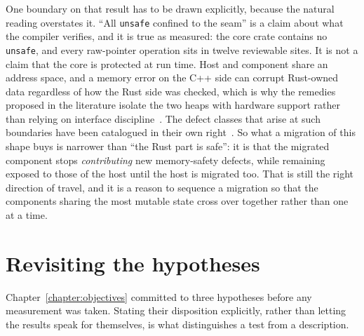 \documentclass[english,twoside,openright,a4paper,censored,csm,software-track-2020]{HYthesisML}
\begin{document}
One boundary on that result has to be drawn explicitly, because the natural reading overstates
it. ``All \texttt{unsafe} confined to the seam'' is a claim about what the compiler verifies,
and it is true as measured: the core crate contains no \texttt{unsafe}, and every raw-pointer
operation sits in twelve reviewable sites. It is not a claim that the core is protected at run
time. Host and component share an address space, and a memory error on the C++ side can corrupt
Rust-owned data regardless of how the Rust side was checked, which is why the remedies proposed
in the literature isolate the two heaps with hardware support rather than relying on interface
discipline~\cite{rivera2021galeed,kirth2022pkrusafe}. The defect classes that arise at such
boundaries have been catalogued in their own right~\cite{li2022crosslang}. So what a migration
of this shape buys is narrower than ``the Rust part is safe'': it is that the migrated
component stops \emph{contributing} new memory-safety defects, while remaining exposed to those
of the host until the host is migrated too. That is still the right direction of travel, and it
is a reason to sequence a migration so that the components sharing the most mutable state cross
over together rather than one at a time.

\section{Revisiting the hypotheses}
Chapter~\ref{chapter:objectives} committed to three hypotheses before any measurement was
taken. Stating their disposition explicitly, rather than letting the results speak for
themselves, is what distinguishes a test from a description.
\end{document}
